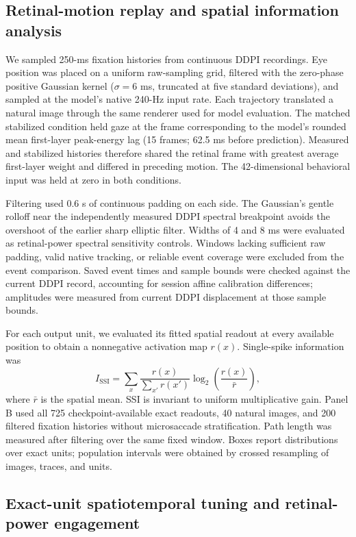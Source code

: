 
\subsection{Retinal-motion replay and spatial information analysis}

We sampled 250-ms fixation histories from continuous DDPI recordings. Eye
position was placed on a uniform raw-sampling grid, filtered with the
zero-phase positive Gaussian kernel ($\sigma=6$ ms, truncated at five standard
deviations), and sampled at the model's native 240-Hz
input rate. Each trajectory translated a natural image through the same
renderer used for model evaluation. The matched stabilized condition held gaze
at the frame corresponding to the model's rounded mean first-layer peak-energy
lag (15 frames; 62.5 ms before prediction). Measured and stabilized histories
therefore shared the retinal frame with greatest average first-layer weight
and differed in preceding motion. The 42-dimensional behavioral input was held
at zero in both conditions.

Filtering used 0.6 s of continuous padding on each side. The Gaussian's gentle
rolloff near the independently measured DDPI spectral breakpoint avoids the
overshoot of the earlier sharp elliptic filter. Widths of 4 and 8 ms were
evaluated as retinal-power spectral sensitivity controls. Windows lacking sufficient raw padding,
valid native tracking, or reliable event coverage were excluded from the
event comparison. Saved event times and sample bounds were checked against
the current DDPI record, accounting for session affine calibration differences;
amplitudes were measured from current DDPI displacement at those sample bounds.

For each output unit, we evaluated its fitted spatial readout at every
available position to obtain a nonnegative activation map $r(x)$. Single-spike
information was
\[
  I_{\mathrm{SSI}} = \sum_x \frac{r(x)}{\sum_{x'}r(x')}
  \log_2\!\left(\frac{r(x)}{\bar r}\right),
\]
where $\bar r$ is the spatial mean. SSI is invariant to uniform multiplicative
gain. Panel B used all 725 checkpoint-available exact readouts, 40 natural
images, and 200 filtered fixation histories without microsaccade
stratification. Path length was measured after filtering over the same fixed
window. Boxes report distributions over exact units; population intervals were
obtained by crossed resampling of images, traces, and units.

\subsection{Exact-unit spatiotemporal tuning and retinal-power engagement}


